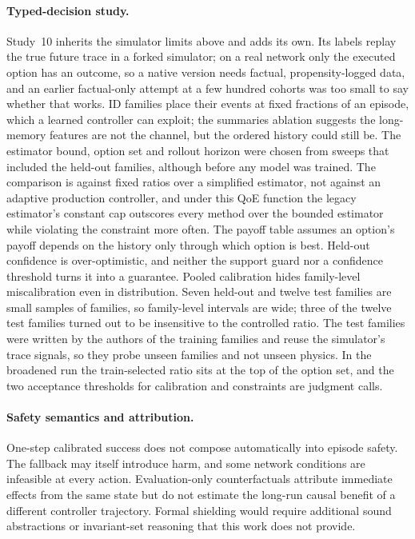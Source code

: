 \documentclass[10pt]{article}
\begin{document}
\paragraph{Typed-decision study.}
Study~10 inherits the simulator limits above and adds its own. Its labels replay the true future trace in a forked simulator; on a real network only the executed option has an outcome, so a native version needs factual, propensity-logged data, and an earlier factual-only attempt at a few hundred cohorts was too small to say whether that works. ID families place their events at fixed fractions of an episode, which a learned controller can exploit; the summaries ablation suggests the long-memory features are not the channel, but the ordered history could still be. The estimator bound, option set and rollout horizon were chosen from sweeps that included the held-out families, although before any model was trained. The comparison is against fixed ratios over a simplified estimator, not against an adaptive production controller, and under this QoE function the legacy estimator's constant cap outscores every method over the bounded estimator while violating the constraint more often. The payoff table assumes an option's payoff depends on the history only through which option is best. Held-out confidence is over-optimistic, and neither the support guard nor a confidence threshold turns it into a guarantee. Pooled calibration hides family-level miscalibration even in distribution. Seven held-out and twelve test families are small samples of families, so family-level intervals are wide; three of the twelve test families turned out to be insensitive to the controlled ratio. The test families were written by the authors of the training families and reuse the simulator's trace signals, so they probe unseen families and not unseen physics. In the broadened run the train-selected ratio sits at the top of the option set, and the two acceptance thresholds for calibration and constraints are judgment calls.

\paragraph{Safety semantics and attribution.}
One-step calibrated success does not compose automatically into episode safety. The fallback may itself introduce harm, and some network conditions are infeasible at every action. Evaluation-only counterfactuals attribute immediate effects from the same state but do not estimate the long-run causal benefit of a different controller trajectory. Formal shielding would require additional sound abstractions or invariant-set reasoning that this work does not provide.
\end{document}
